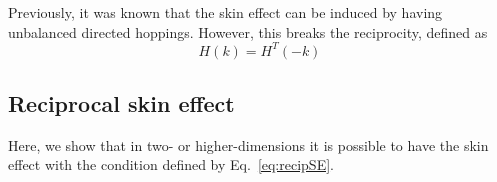 Previously, it was known that the skin effect can be induced by having unbalanced directed hoppings. However, this breaks the reciprocity, defined as 
\begin{equation}
H (k) = H^{T} (-k)
\label{eq:recipSE}
\end{equation}


\subsection{Reciprocal skin effect}

Here, we show that in two- or higher-dimensions it is possible to have the skin effect with the condition defined by Eq.~\eqref{eq:recipSE}.

